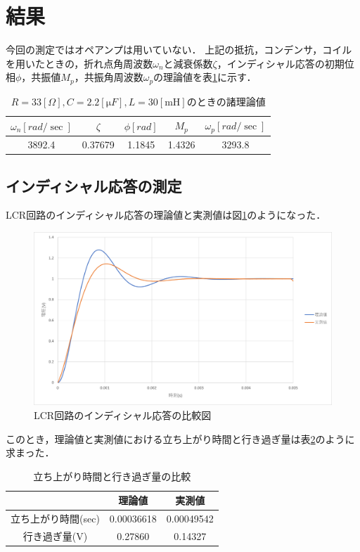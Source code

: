 \documentclass{jlreq}
\numberwithin{equation}{section}
\begin{document}
\section{結果}
今回の測定ではオペアンプは用いていない．
上記の抵抗，コンデンサ，コイルを用いたときの，折れ点角周波数$\omega_n$と減衰係数$\zeta$，インディシャル応答の初期位相$\phi$，共振値$M_p$，共振角周波数$\omega_p$の理論値を表\ref{tab:each_theo}に示す．
\begin{table}[H]
  \centering
  \caption{$R=33[\si{\Omega}], C=2.2[\si{\micro F}], L=30[\si{\milli\henry}]$のときの諸理論値}
  \begin{tabular}{|c|c|c|c|c|}
    \hline
    $\omega_n[\si{rad\per\sec}]$ & $\zeta$ & $\phi[\si{rad}]$ & $M_p$  & $\omega_p[\si{rad\per\sec}]$ \\
    \hline
    3892.4                       & 0.37679 & 1.1845           & 1.4326 & 3293.8                       \\
    \hline
  \end{tabular}
  \label{tab:each_theo}
\end{table}

\subsection{インディシャル応答の測定}
LCR回路のインディシャル応答の理論値と実測値は図\ref{fig:lcr_indicial_without_opamp}のようになった．
\begin{figure}[H]
  \centering
  \includegraphics[width=\textwidth]{assets/lcr_indicial_without_opamp.png}
  \caption{LCR回路のインディシャル応答の比較図}
  \label{fig:lcr_indicial_without_opamp}
\end{figure}

このとき，理論値と実測値における立ち上がり時間と行き過ぎ量は表\ref{tab:rise_time_and_over_excessive_amount}のように求まった．
\begin{table}[H]
  \centering
  \caption{立ち上がり時間と行き過ぎ量の比較}
  \begin{tabular}{|c|c|c|}
    \hline
    ~                   & 理論値     & 実測値     \\
    \hline
    立ち上がり時間(sec) & 0.00036618 & 0.00049542 \\
    \hline
    行き過ぎ量(V)       & 0.27860    & 0.14327    \\
    \hline
  \end{tabular}
  \label{tab:rise_time_and_over_excessive_amount}
\end{table}
\end{document}
